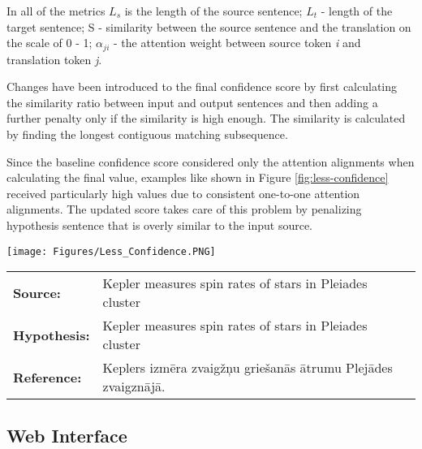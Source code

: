 \documentclass[runningheads,a4paper]{lncs/llncs}
\begin{document}
In all of the metrics \(L_{s}\) is the length of the source sentence; \(L_{t}\) - length of the target sentence; S - similarity between the source sentence and the translation on the scale of 0 - 1; \(\alpha_{ji}\) - the attention weight between source token \textit{i} and translation token \textit{j}.

Changes have been introduced to the final confidence score by first calculating the similarity ratio between input and output sentences and then adding a further penalty only if the similarity is high enough. The similarity is calculated by finding the longest contiguous matching subsequence.

Since the baseline confidence score considered only the attention alignments when calculating the final value, examples like shown in Figure \ref{fig:less-confidence} received particularly high values due to consistent one-to-one attention alignments. The updated score takes care of this problem by penalizing hypothesis sentence that is overly similar to the input source. 

\begin{figure*}[t]
  \texttt{[image: Figures/Less\_Confidence.PNG]}
  \begin{tabular}{lp{10.4cm}}
   \bf Source: & Kepler measures spin rates of stars in Pleiades cluster \\
   \bf Hypothesis: & Kepler measures spin rates of stars in Pleiades cluster \\
   \bf Reference: & Keplers izmēra zvaigžņu griešanās ātrumu Plejādes zvaigznājā. \\
  \end{tabular}
  \caption{An example of a translated sentence that exhibits a verbatim rendition of the input. CDP: 100.0\%; \(\AP_{out}\): 98.84\%; \(\AP_{in}\): 98.85\%; Baseline Confidence: \textbf{95.44\%}; Updated Confidence: \textbf{25.02\%}; }  
  \label{fig:less-confidence}
\end{figure*}

\subsection{Web Interface}
\label{sec:web}
\end{document}
